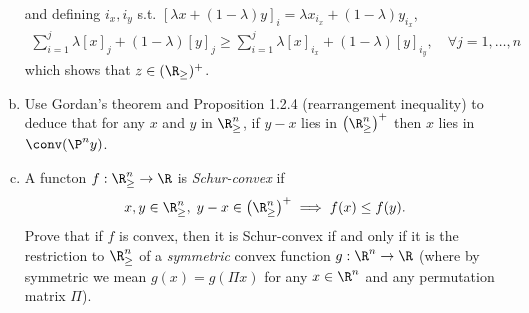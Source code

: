 \documentclass[../borwein-lewis_notes.tex]{subfiles}
\begin{document}
\begin{enumerate}[(a)]
{\begin{equation*}
\end{equation*}
and defining $i_x, i_y$ s.t. $[\lambda x + (1-\lambda)y]_i 
= \lambda x_{i_x} + (1-\lambda)y_{i_x}$, 
\begin{align*}
\sum_{i=1}^j \lambda [x]_j + (1-\lambda)[y]_j 
\geq \sum_{i=1}^j \lambda [x]_{i_x} + (1-\lambda)[y]_{i_y},
\quad \forall j=1,\ldots,n
\end{align*}
which shows that $z\in (\R_{\geq})^+$.
}
\item Use Gordan's theorem and Proposition 1.2.4 (rearrangement 
inequality) to deduce that for 
any $x$ and $y$ in $\R_{\geq}^n$, if $y-x$ lies in $\left(\R_{\geq}^n
\right)^+$ then $x$ lies in $\conv(\P^ny)$. \\
\item A functon $f:\R_{\geq}^n\to\R$ is \textit{Schur-convex} if 
\begin{equation*}
x,y\in\R_{\geq}^n, \;y-x\in\left(\R_{\geq}^n\right)^+ \implies 
f(x)\leq f(y).
\end{equation*}
Prove that if $f$ is convex, then it is Schur-convex if and only if it is 
the restriction to $\R_{\geq}^n$ of a \textit{symmetric} convex function 
$g:\R^n\to\R$ (where by symmetric we mean $g(x)=g(\Pi x)$ for 
any $x\in\R^n$ and any permutation matrix $\Pi$).\\
\end{enumerate}
\end{document}
